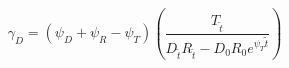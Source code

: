 \documentclass[10pt]{article}
\begin{document}
\[\gamma_D = ({\psi_D}+{\psi_R}-{\psi_T}) \left(\frac{{T_{\tilde{t}}}}{{D_{\tilde{t}}}{R_{\tilde{t}}}-{D_0}{R_0}e^{\psi_T{\tilde{t}}}} \right)

\]
\end{document}
